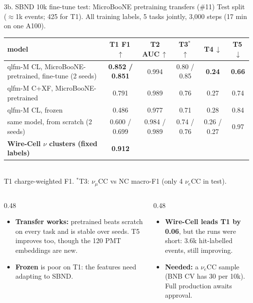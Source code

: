 \documentclass[aspectratio=169,10pt]{beamer}
\newcommand{\good}[1]{{\color{green!45!black}\textbf{#1}}}
\newcommand{\iss}[1]{{\color{blue!60!black}\##1}}
\begin{document}
\begin{frame}{3b. SBND 10k fine-tune test: MicroBooNE pretraining transfers (\iss{11})}
  \footnotesize
  \centering
  \scriptsize
  Test split ($\approx$1k events; 425 for T1). All training labels, 5 tasks jointly, 3,000 steps (17 min on one A100).\\[3pt]
  \begin{tabular}{lccccc}
    \toprule
    model & T1 F1\,$\uparrow$ & T2 AUC\,$\uparrow$ & T3$^\ast$\,$\uparrow$ & T4\,$\downarrow$ & T5\,$\downarrow$ \\
    \midrule
    qlfm-M CL, MicroBooNE-pretrained, fine-tune (2 seeds) & \good{0.852 / 0.851} & 0.994 & 0.80 / 0.85 & \good{0.24} & \good{0.66} \\
    qlfm-M C+XF, MicroBooNE-pretrained & 0.791 & 0.989 & 0.76 & 0.27 & 0.74 \\
    qlfm-M CL, frozen & 0.486 & 0.977 & 0.71 & 0.28 & 0.84 \\
    same model, from scratch (2 seeds) & 0.600 / 0.699 & 0.984 / 0.989 & 0.74 / 0.76 & 0.26 / 0.27 & 0.97 \\
    \midrule
    \textbf{Wire-Cell $\nu$ clusters (fixed labels)} & \textbf{0.912} & & & & \\
    \bottomrule
  \end{tabular}\\[1pt]
  {\tiny T1 charge-weighted F1. $^\ast$T3: $\nu_\mu$CC vs NC macro-F1 (only 4 $\nu_e$CC in test).}
  \vspace{6pt}
  \raggedright\footnotesize
  \begin{columns}[T]
    \begin{column}{0.48\textwidth}
      \begin{itemize}
        \item \textbf{Transfer works:} pretrained beats scratch on every task and is stable over seeds.
          T5 improves too, though the 120 PMT embeddings are new.
        \item \textbf{Frozen} is poor on T1: the features need adapting to SBND.
      \end{itemize}
    \end{column}
    \begin{column}{0.48\textwidth}
      \begin{itemize}
        \item \textbf{Wire-Cell leads T1 by 0.06}, but the runs were short: 3.6k hit-labelled events, still improving.
        \item \textbf{Needed:} a $\nu_e$CC sample (BNB CV has 30 per 10k). Full production awaits approval.
      \end{itemize}
    \end{column}
  \end{columns}
\end{frame}
\end{document}
